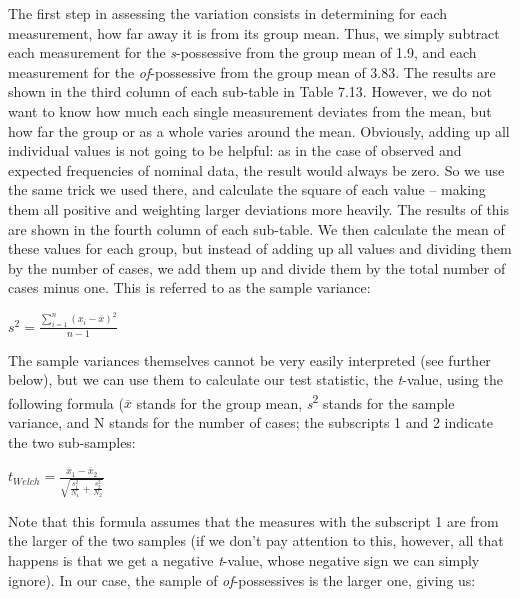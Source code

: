 The first step in assessing the variation consists in determining for each measurement, how far away it is from its group mean. Thus, we simply subtract each measurement for the \textit{s}-possessive from the group mean of 1.9, and each measurement for the \textit{of}-possessive from the group mean of 3.83. The results are shown in the third column of each sub-table in Table 7.13. However, we do not want to know how much each single measurement deviates from the mean, but how far the group  or  as a whole varies around the mean. Obviously, adding up all individual values is not going to be helpful: as in the case of observed and expected frequencies of nominal data, the result would always be zero. So we use the same trick we used there, and calculate the square of each value -- making them all positive and weighting larger deviations more heavily. The results of this are shown in the fourth column of each sub-table. We then calculate the mean of these values for each group, but instead of adding up all values and dividing them by the number of cases, we add them up and divide them by the total number of cases minus one. This is referred to as the sample variance:

\begin{exe}
\ex $\displaystyle{s^2=\frac{\sum _{i=1}^n(x_i-\overline{x})^2}{n-1}}$
\label{ex:formulasamplevariance}
\end{exe}

The sample variances themselves cannot be very easily interpreted (see further below), but we can use them to calculate our test statistic, the \textit{t}-value, using the following formula ($\overline{x}$ stands for the group mean, \textit{s}\textsuperscript{2} stands for the sample variance, and N stands for the number of cases; the subscripts 1 and 2 indicate the two sub-samples:

\begin{exe}
\ex $\displaystyle{t_{Welch} = \frac{\overline{x}_1 - \overline{x}_2}{\sqrt{\frac{s_1^2}{N_1} + \frac{s_2^2}{N_2}}}}$ 
\label{ex:formulawelchst}
\end{exe}

Note that this formula assumes that the measures with the subscript 1 are from the larger of the two samples (if we don't pay attention to this, however, all that happens is that we get a negative \textit{t}-value, whose negative sign we can simply ignore). In our case, the sample of \textit{of}-possessives is the larger one, giving us:

